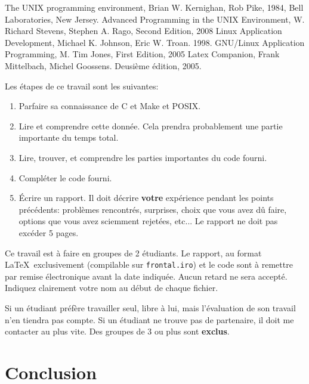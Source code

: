 \documentclass{article}
\begin{document}
\newpage
\begin{thebibliography}{5}

  The UNIX programming environment, 
  Brian W. Kernighan, Rob Pike,
  1984, Bell Laboratories, New Jersey. 
  Advanced Programming in the UNIX Environment, 
  W. Richard Stevens, Stephen A. Rago,
  Second Edition, 2008  
  Linux Application Development,
  Michael K. Johnson, Eric W. Troan.
  1998.
  GNU/Linux Application Programming, 
  M. Tim Jones,
  First Edition, 2005  
  Latex Companion,
  Frank Mittelbach, Michel Goossens.
  Deusième édition, 2005.  

\end{thebibliography}

Les étapes de ce travail sont les suivantes:
\begin{enumerate}
\item Parfaire sa connaissance de C et Make et POSIX.
\item Lire et comprendre cette donnée.  Cela prendra probablement une partie
  importante du temps total.
\item Lire, trouver, et comprendre les parties importantes du code fourni.
\item Compléter le code fourni.
\item Écrire un rapport.  Il doit décrire \textbf{votre} expérience pendant
  les points précédents: problèmes rencontrés, surprises, choix que vous
  avez dû faire, options que vous avez sciemment rejetées, etc...  Le
  rapport ne doit pas excéder 5 pages.
\end{enumerate}

Ce travail est à faire en groupes de 2 étudiants.  Le rapport, au format
\LaTeX\ exclusivement (compilable sur \texttt{frontal.iro}) et le code sont
à remettre par remise électronique avant la date indiquée.  Aucun retard ne
sera accepté.  Indiquez clairement votre nom au début de chaque fichier.

Si un étudiant préfère travailler seul, libre à lui, mais l'évaluation de
son travail n'en tiendra pas compte.  Si un étudiant ne trouve pas de
partenaire, il doit me contacter au plus vite.  Des groupes de 3 ou plus
sont \textbf{exclus}.

\newpage
\section{Conclusion}
\end{document}
